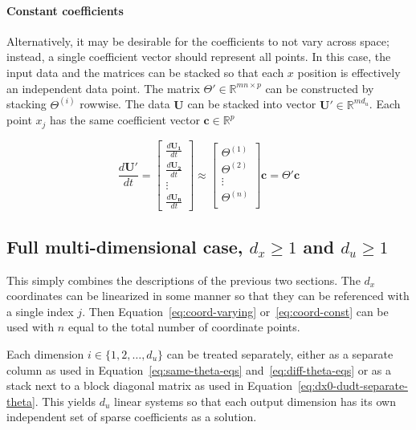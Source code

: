 \documentclass{article}
\let\vec\mathbf
\def\real{\mathbb{R}}
\begin{document}
\paragraph{Constant coefficients}
Alternatively, it may be desirable for the coefficients to not vary across
space; instead, a single coefficient vector should represent all points. In this
case, the input data and the matrices can be stacked so that each $x$ position
is effectively an independent data point. The matrix $\Theta' \in \real^{mn
\times p}$ can be constructed by stacking $\Theta^{(i)}$ rowwise. The
data $\vec{U}$ can be stacked into vector $\vec{U'} \in \real^{md_u}$. Each
point $x_j$ has the same coefficient vector $\vec{c} \in \real^p$

\begin{equation}\label{eq:coord-const}
\frac{d\vec{U'}}{dt} = 
\begin{bmatrix}
\frac{d\vec{U_1}}{dt} \\ \frac{d\vec{U_2}}{dt} \\ \vdots \\ \frac{d\vec{U_{n}}}{dt}
\end{bmatrix}
\approx
\begin{bmatrix}
\Theta^{(1)} \\
\Theta^{(2)} \\
\vdots \\
\Theta^{(n)} \\
\end{bmatrix}
\vec{c}
= \Theta' \vec{c}
\end{equation}

\subsection{Full multi-dimensional case, $d_x \ge 1$ and $d_u \ge 1$}
This simply combines the descriptions of the previous two sections. The $d_x$
coordinates can be linearized in some manner so that they can be referenced with
a single index $j$. Then Equation~\ref{eq:coord-varying} or~\ref{eq:coord-const}
can be used with $n$ equal to the total number of coordinate points.

Each dimension $i \in \{1,2,\hdots,d_u \}$ can be treated separately, either as
a separate column as used in Equation~\ref{eq:same-theta-eqs}
and~\ref{eq:diff-theta-eqs} or as a stack next to a block diagonal matrix as
used in Equation~\ref{eq:dx0-dudt-separate-theta}. This yields $d_u$ linear
systems so that each output dimension has its own independent set of sparse
coefficients as a solution.
\end{document}
